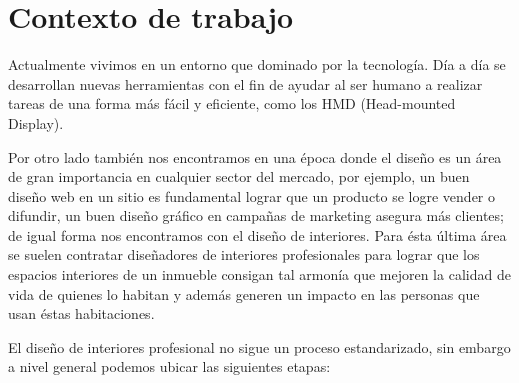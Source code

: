 \section{Contexto de trabajo}

Actualmente vivimos en un entorno que dominado por la tecnología. Día a día se desarrollan nuevas herramientas con el fin de ayudar al ser humano a realizar tareas de una forma más fácil y eficiente, como los HMD (Head-mounted Display)\cite{B15}.


Por otro lado también nos encontramos en una época donde el diseño es un área de gran importancia en cualquier sector del mercado, por ejemplo, un buen diseño web en un sitio es fundamental lograr que un producto se logre vender o difundir, un buen diseño gráfico en campañas de marketing asegura más clientes; de igual forma nos encontramos con el diseño de interiores. Para ésta última área se suelen contratar diseñadores de interiores profesionales para lograr que los espacios interiores de un inmueble consigan tal armonía que mejoren la calidad de vida de quienes lo habitan y además generen un impacto en las personas que usan éstas habitaciones.\par
El diseño de interiores profesional no sigue un proceso estandarizado, sin embargo a nivel general podemos ubicar las siguientes etapas:

